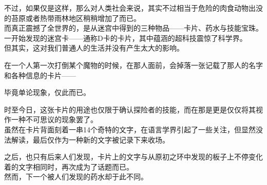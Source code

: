 不过，如果仅是这样，那么对人类社会来说，其实不过相当于危险的肉食动物出没的苔原或者热带雨林地区稍稍增加了而已。\\

而真正震撼了全世界的，是从迷宫中得到的三种物品——卡片、药水与技能宝珠。\\

一开始发现的迷宫卡——通称D卡的卡片，其中蕴涵的超科技震惊了科学界。\\

但其实，这对我们普通人的生活并没有产生太大的影响。

在一个人第一次打倒某个魔物的时候，在那人面前，会掉落一张记载了那人的名字和各种信息的卡片——

毕竟单论现象，仅此而已。

时至今日，这张卡片的用途也仅限于确认探险者的技能，而在那是更是仅仅将其视作一种不可思议的现象罢了。\\

虽然在卡片背面刻着一串14个奇特的文字，在语言学界引起了一些关注，但显然没法解读，最后仅作为一种新的文字被记录下来收场。

之后，也只有后来人们发现，卡片上的文字与从原初之环中发现的板子上不停变化着的文字相同时，再次成为了话题而已。\\

然而，下一个被人们发现的药水却于此不同。\\

